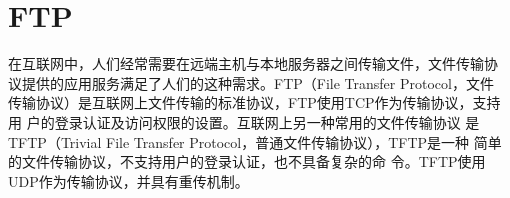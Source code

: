 \section{FTP}
\label{sec:FTP}

在互联网中，人们经常需要在远端主机与本地服务器之间传输文件，文件传输协
议提供的应用服务满足了人们的这种需求。FTP（File Transfer Protocol，文件
传输协议）是互联网上文件传输的标准协议，FTP使用TCP作为传输协议，支持用
户的登录认证及访问权限的设置。互联网上另一种常用的文件传输协议
是TFTP（Trivial File Transfer Protocol，普通文件传输协议），TFTP是一种
简单的文件传输协议，不支持用户的登录认证，也不具备复杂的命
令。TFTP使用UDP作为传输协议，并具有重传机制。

